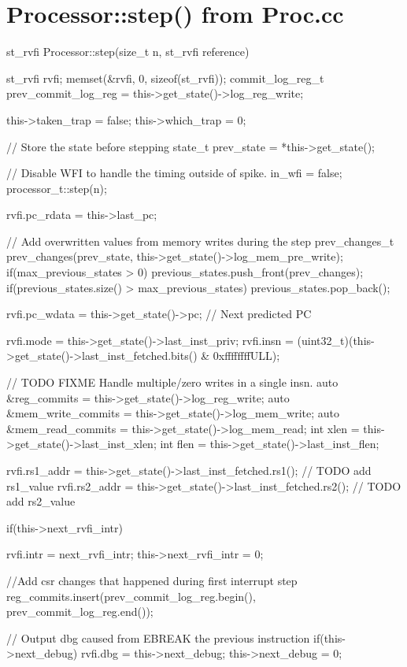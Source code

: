 \chapter{Processor::step() from Proc.cc}
\label{app:spike_step}


\begin{clisting}
st_rvfi Processor::step(size_t n, st_rvfi reference) {
  st_rvfi rvfi;
  memset(&rvfi, 0, sizeof(st_rvfi));
  commit_log_reg_t prev_commit_log_reg = this->get_state()->log_reg_write;


  this->taken_trap = false;
  this->which_trap = 0;

  // Store the state before stepping
  state_t prev_state = *this->get_state();

  // Disable WFI to handle the timing outside of spike.
  in_wfi = false;
  processor_t::step(n);

  rvfi.pc_rdata = this->last_pc;

  // Add overwritten values from memory writes during the step
  prev_changes_t prev_changes(prev_state, this->get_state()->log_mem_pre_write);
  if(max_previous_states > 0) {
    previous_states.push_front(prev_changes);
  }
  if(previous_states.size() > max_previous_states) {
    previous_states.pop_back();
  }

  rvfi.pc_wdata = this->get_state()->pc; // Next predicted PC

  rvfi.mode = this->get_state()->last_inst_priv;
  rvfi.insn =
      (uint32_t)(this->get_state()->last_inst_fetched.bits() & 0xffffffffULL);

  // TODO FIXME Handle multiple/zero writes in a single insn.
  auto &reg_commits = this->get_state()->log_reg_write;
  auto &mem_write_commits = this->get_state()->log_mem_write;
  auto &mem_read_commits = this->get_state()->log_mem_read;
  int xlen = this->get_state()->last_inst_xlen;
  int flen = this->get_state()->last_inst_flen;

  rvfi.rs1_addr = this->get_state()->last_inst_fetched.rs1();
  // TODO add rs1_value
  rvfi.rs2_addr = this->get_state()->last_inst_fetched.rs2();
  // TODO add rs2_value


  if(this->next_rvfi_intr){
    rvfi.intr = next_rvfi_intr;
    this->next_rvfi_intr = 0;

    //Add csr changes that happened during first interrupt step
    reg_commits.insert(prev_commit_log_reg.begin(), prev_commit_log_reg.end());
  }
  
  // Output dbg caused from EBREAK the previous instruction
  if(this->next_debug) {
    rvfi.dbg = this->next_debug;
    this->next_debug = 0;
  }

}
\end{clisting}

